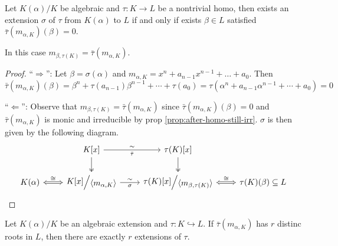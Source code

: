 \begin{lemma} \label{lemma:extension-exists-condition}
  Let $K(\alpha) / K$ be algebraic and $\tau: K \to L$ be a nontrivial homo,
  then exists an extension $\sigma$ of $\tau$ from $K(\alpha)$ to $L$ if and only if
  exists $\beta \in L$ satisfied $\bar\tau(m_{\alpha, K})(\beta) = 0$.

  In this case $m_{\beta, \tau(K)} = \bar\tau(m_{\alpha, K})$.

\begin{proof}
  ``$\Rightarrow$'': Let $\beta = \sigma(\alpha)$ and $m_{\alpha, K} = x^n + a_{n-1} x^{n-1} + \ldots + a_0$.
  Then $\bar\tau(m_{\alpha, K})(\beta) = \beta^n + \tau(a_{n-1})\beta^{n-1} + \cdots + \tau(a_0)
  = \tau(\alpha^n + a_{n-1} \alpha^{n-1} + \cdots + a_0) = 0$

  ``$\Leftarrow$'': Observe that $m_{\beta, \tau(K)} = \bar\tau(m_{\alpha, K})$ since
  $\bar\tau(m_{\alpha, K})(\beta) = 0$ and $\bar\tau(m_{\alpha, K})$ is monic and irreducible
  by prop \ref{prop:after-homo-still-irr}. $\sigma$ is then given by the following diagram.
  \[
    \begin{tikzcd}
      & K[x] \arrow[r, "\sim", "\bar\tau"'] \arrow[d, two heads]
      & \tau(K)[x] \arrow[d, two heads] \\
      K(\alpha) \arrow[r, Leftrightarrow, "\cong"]
      & \raisebox{.1em}{$K[x]$} \Big/ \raisebox{-.1em}{$\langle m_{\alpha, K} \rangle$}
      \arrow[r, "\sim", "\sigma"']
      & \raisebox{.1em}{$\tau(K)[x]$} \Big/ \raisebox{-.1em}{$\langle m_{\beta, \tau(K)} \rangle$}
      \arrow[r, Leftrightarrow, "\cong"]
      & \tau(K)(\beta) \subseteq L
    \end{tikzcd}
  \]
\end{proof}
\end{lemma}

\begin{coro}
  Let $K(\alpha)/K$ be an algebraic extension and $\tau: K \hookrightarrow L$.
  If $\bar\tau(m_{\alpha, K})$ has $r$ distinc roots in $L$, then there are exactly $r$ extensions of $\tau$.
\end{coro}

